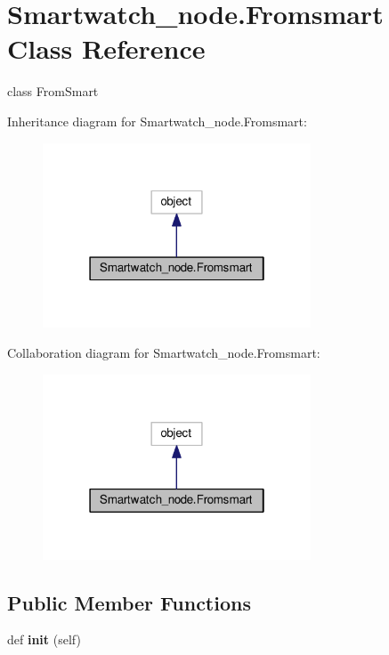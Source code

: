 \hypertarget{classSmartwatch__node_1_1Fromsmart}{}\section{Smartwatch\+\_\+node.\+Fromsmart Class Reference}
\label{classSmartwatch__node_1_1Fromsmart}


class From\+Smart  




Inheritance diagram for Smartwatch\+\_\+node.\+Fromsmart\+:
\nopagebreak
\begin{figure}[H]
\begin{center}
\leavevmode
\includegraphics[width=226pt]{classSmartwatch__node_1_1Fromsmart__inherit__graph}
\end{center}
\end{figure}


Collaboration diagram for Smartwatch\+\_\+node.\+Fromsmart\+:
\nopagebreak
\begin{figure}[H]
\begin{center}
\leavevmode
\includegraphics[width=226pt]{classSmartwatch__node_1_1Fromsmart__coll__graph}
\end{center}
\end{figure}
\subsection*{Public Member Functions}
\begin{DoxyCompactItemize}
\item 
def {\bfseries init} (self)\hypertarget{classSmartwatch__node_1_1Fromsmart_a4f503d9ce16992632a0c672dc718cb0b}{}\label{classSmartwatch__node_1_1Fromsmart_a4f503d9ce16992632a0c672dc718cb0b}

\end{DoxyCompactItemize}
